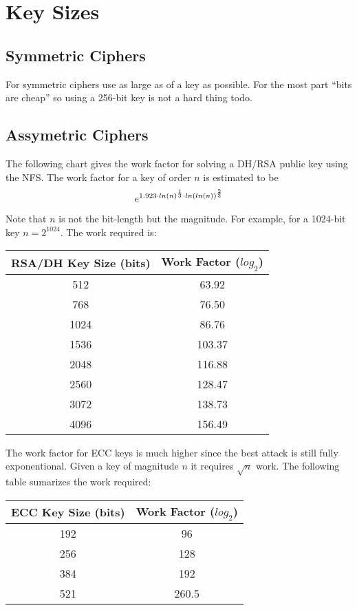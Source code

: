 \documentclass{book}
\begin{document}
\section{Key Sizes}

\subsection{Symmetric Ciphers}
For symmetric ciphers use as large as of a key as possible.  For the most part ``bits are cheap'' so using a 256-bit key
is not a hard thing todo.  

\subsection{Assymetric Ciphers}
The following chart gives the work factor for solving a DH/RSA public key using the NFS.  The work factor for a key of order
$n$ is estimated to be
\begin{equation}
e^{1.923 \cdot ln(n)^{1 \over 3} \cdot ln(ln(n))^{2 \over 3}} 
\end{equation}

Note that $n$ is not the bit-length but the magnitude.  For example, for a 1024-bit key $n = 2^{1024}$.  The work required 
is:
\begin{center}
\begin{tabular}{|c|c|}
    \hline RSA/DH Key Size (bits) & Work Factor ($log_2$) \\
    \hline 512 & 63.92 \\
    \hline 768 & 76.50 \\
    \hline 1024 & 86.76 \\
    \hline 1536 & 103.37 \\
    \hline 2048 & 116.88 \\
    \hline 2560 & 128.47 \\
    \hline 3072 & 138.73 \\
    \hline 4096 & 156.49 \\
    \hline 
\end{tabular}
\end{center}

The work factor for ECC keys is much higher since the best attack is still fully exponentional.  Given a key of magnitude
$n$ it requires $\sqrt n$ work.  The following table sumarizes the work required:
\begin{center}
\begin{tabular}{|c|c|}
    \hline ECC Key Size (bits) & Work Factor ($log_2$) \\
    \hline 192 & 96  \\
    \hline 256 & 128 \\
    \hline 384 & 192 \\
    \hline 521 & 260.5 \\
    \hline
\end{tabular}
\end{center}
\end{document}
